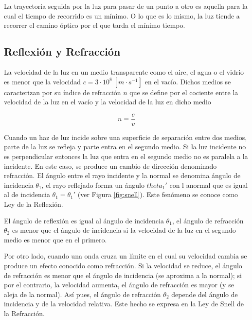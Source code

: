 \documentclass{tufte-handout}
\begin{document}
La trayectoria seguida por la luz para pasar de un punto a otro es aquella para la cual el tiempo de recorrido es un mínimo. O lo que es lo mismo, la luz tiende a recorrer el camino óptico por el que tarda el mínimo tiempo.

\subsection{Reflexión y Refracción}

La velocidad de la luz en un medio transparente como el aire, el agua o el vidrio es menor que la velocidad $c = 3\cdot 10^8~[m\cdot s^{-1}]$ en el vacío. Dichos medios se caracterizan por su índice de refracción $n$  que se define por el cociente entre la velocidad de la luz en el vacío y la velocidad de la luz en dicho medio

\begin{equation}
n = \frac{c}{v}
\end{equation}

Cuando un haz de luz incide sobre una superficie de separación entre dos medios, parte de la luz se refleja y parte entra en el segundo medio. Si la luz incidente no es perpendicular entonces la luz que entra en el segundo medio no es paralela a la incidente. En este caso, se produce un cambio de dirección denominado refracción. El ángulo entre el rayo incidente y la normal se denomina ángulo de incidencia $\theta_1$, el rayo reflejado forma un ángulo $theta_1'$ con l anormal que es igual al de incidencia $\theta_1 = \theta_1'$ (ver Figura \ref{fig:snell}). Este fenómeno se conoce como Ley de la Reflexión.

\begin{marginfigure}%
    \centering
    
    \bigskip
    \caption{El ángulo de reflexión es igual al ángulo de incidencia $\theta_1$, el ángulo de refracción $\theta_2$ es menor que el ángulo de incidencia si la velocidad de la luz en el segundo medio es menor que en el primero.}
    \label{fig:snell}
\end{marginfigure}

Por otro lado, cuando una onda cruza un límite en el cual su velocidad cambia se produce un efecto conocido como refracción. Si la velocidad se reduce, el ángulo de refracción es menor que el ángulo de incidencia (se aproxima a la normal); si por el contrario, la velocidad aumenta, el ángulo de refracción es mayor (y se aleja de la normal). Así pues, el ángulo de refracción $\theta_2$ depende del ángulo de incidencia y de la velocidad relativa. Este hecho se expresa en la Ley de Snell de la Refracción.
\end{document}
